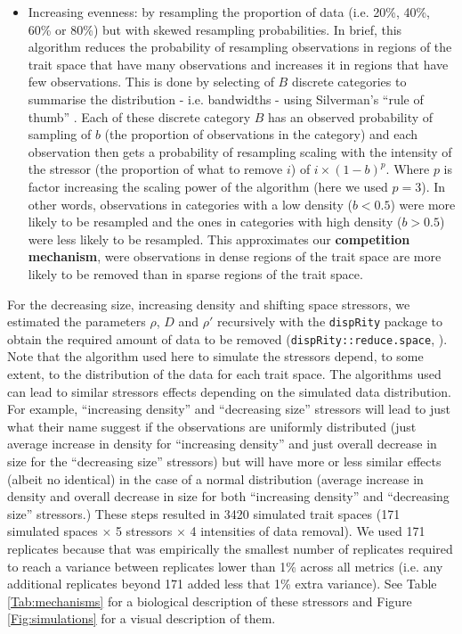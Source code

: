 \documentclass[12pt,letterpaper]{article}
\begin{document}
\begin{itemize}
\item Increasing evenness: by resampling the proportion of data (i.e. 20\%, 40\%, 60\% or 80\%) but with skewed resampling probabilities.
In brief, this algorithm reduces the probability of resampling observations in regions of the trait space that have many observations and increases it in regions that have few observations.
This is done by selecting of $B$ discrete categories to summarise the distribution - i.e. bandwidths - using Silverman's ``rule of thumb'' \citep[\texttt{bw.nrd0()} function in \texttt{R};][]{silverman1986density}.
Each of these discrete category $B$ has an observed probability of sampling of $b$ (the proportion of observations in the category) and each observation then gets a probability of resampling scaling with the intensity of the stressor (the proportion of what to remove $i$) of $i \times (1-b)^{p}$. 
Where $p$ is factor increasing the scaling power of the algorithm (here we used $p=3$).
In other words, observations in categories with a low density ($b<0.5$) were more likely to be resampled and the ones in categories with high density ($b>0.5$) were less likely to be resampled.
This approximates our \textbf{competition mechanism}, were observations in dense regions of the trait space are more likely to be removed than in sparse regions of the trait space.
\end{itemize}

For the decreasing size, increasing density and shifting space stressors, we estimated the parameters $\rho$, $D$ and $\rho'$ recursively with the \texttt{dispRity} package to obtain the required amount of data to be removed (\texttt{dispRity::reduce.space}, \citealt{guillerme2018disprity,guillerme2020shifting}).
Note that the algorithm used here to simulate the stressors depend, to some extent, to the distribution of the data for each trait space.
The algorithms used can lead to similar stressors effects depending on the simulated data distribution.
For example, ``increasing density'' and ``decreasing size'' stressors will lead to just what their name suggest if the observations are uniformly distributed (just average increase in density for ``increasing density'' and just overall decrease in size for the ``decreasing size'' stressors) but will have more or less similar effects (albeit no identical) in the case of a normal distribution (average increase in density and overall decrease in size for both ``increasing density'' and ``decreasing size'' stressors.)
These steps resulted in 3420 simulated trait spaces (171 simulated spaces $\times$ 5 stressors $\times$ 4 intensities of data removal).
We used 171 replicates because that was empirically the smallest number of replicates required to reach a variance between replicates lower than 1\% across all metrics (i.e. any additional replicates beyond 171 added less that 1\% extra variance).
See Table \ref{Tab:mechanisms} for a biological description of these stressors and Figure \ref{Fig:simulations} for a visual description of them.
\end{document}
